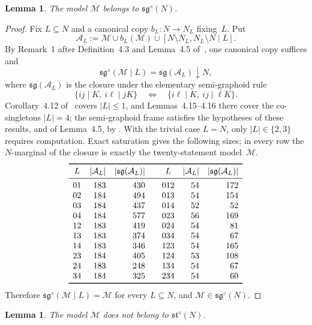 \documentclass[11pt]{amsart}
\newtheorem{lemma}[theorem]{Lemma}
\newcommand{\sg}{\mathfrak{sg}}
\newcommand{\st}{\mathfrak{st}}
\newcommand{\M}{\mathcal{M}}
\newcommand{\A}{\mathcal{A}}
\begin{document}
\begin{lemma}\label{lem:sg}
The model $\M$ belongs to $\sg^{\diamond}(N)$.
\end{lemma}

\begin{proof}
Fix $L\subseteq N$ and a canonical copy $b_L\colon N\to N_L$ fixing~$L$.
Put
\[
  \A_L
  :=\M\cup b_L(\M)
    \cup[N\setminus N_L,N_L\setminus N\mid L].
\]
By Remark~1 after Definition~4.3 and Lemma~4.5 of~\cite{BBS}, one
canonical copy suffices and
\[
  \sg^{\diamond}(\M\mid L)
  =\sg(\A_L)\mathbin{\downarrow}N,
\]
where $\sg(\A_L)$ is the closure under the elementary semi-graphoid rule
\[
 \{ij\mid K,\ i\ell\mid jK\}
 \quad\Longleftrightarrow\quad
 \{i\ell\mid K,\ ij\mid \ell K\}.
\]
Corollary~4.12 of~\cite{BBS} covers $|L|\leq1$, and Lemmas~4.15--4.16 there
cover the co-singletons $|L|=4$; the semi-graphoid frame satisfies the
hypotheses of these results, and of Lemma~4.5, by \cite[Lemmas~3.1, 4.10,
and~4.15]{BBS}. With the trivial case $L=N$, only $|L|\in\{2,3\}$ requires
computation. Exact saturation gives the following sizes; in every row the
$N$-marginal of the closure is exactly the twenty-statement model~$\M$.
\[
\begin{array}{c@{\quad}rr@{\qquad}c@{\quad}rr}
\toprule
L&|\A_L|&|\sg(\A_L)|&L&|\A_L|&|\sg(\A_L)|\\
\midrule
01&183&430&012&54&172\\
02&184&494&013&54&154\\
03&184&437&014&52&52\\
04&184&577&023&56&169\\
12&183&419&024&54&81\\
13&183&374&034&54&67\\
14&183&346&123&54&165\\
23&184&405&124&53&108\\
24&183&248&134&54&67\\
34&184&325&234&54&60\\
\bottomrule
\end{array}
\]
Therefore $\sg^{\diamond}(\M\mid L)=\M$ for every $L\subseteq N$, and
$\M\in\sg^{\diamond}(N)$.
\end{proof}

\begin{lemma}\label{lem:notst}
The model $\M$ does not belong to $\st^{\diamond}(N)$.
\end{lemma}
\end{document}
